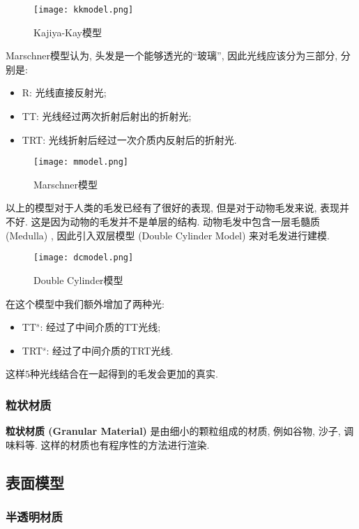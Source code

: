 \begin{figure}[H]
	\centering
	\texttt{[image: kkmodel.png]}
	\caption{Kajiya-Kay模型}
	\label{fig:kk}
\end{figure}

Marschner模型认为, 头发是一个能够透光的``玻璃”, 因此光线应该分为三部分, 分别是: 
\begin{itemize}
	\item R: 光线直接反射光; 
	\item TT: 光线经过两次折射后射出的折射光; 
	\item TRT: 光线折射后经过一次介质内反射后的折射光. 
\end{itemize}

\begin{figure}[H]
	\centering
	\texttt{[image: mmodel.png]}
	\caption{Marschner模型}
	\label{fig:mm}
\end{figure}

以上的模型对于人类的毛发已经有了很好的表现, 但是对于动物毛发来说, 表现并不好. 这是因为动物的毛发并不是单层的结构. 动物毛发中包含一层毛髓质 (Medulla) , 因此引入双层模型 (Double Cylinder Model) 来对毛发进行建模. 

\begin{figure}[H]
	\centering
	\texttt{[image: dcmodel.png]}
	\caption{Double Cylinder模型}
	\label{fig:dc}
\end{figure}

在这个模型中我们额外增加了两种光: 
\begin{itemize}
	\item TT$^s$: 经过了中间介质的TT光线; 
	\item TRT$^s$: 经过了中间介质的TRT光线. 
\end{itemize}

这样$5$种光线结合在一起得到的毛发会更加的真实. 

\subsubsection{粒状材质}

\textbf{粒状材质 (Granular Material) }是由细小的颗粒组成的材质, 例如谷物, 沙子, 调味料等. 这样的材质也有程序性的方法进行渲染. 

\subsection{表面模型}

\subsubsection{半透明材质}

